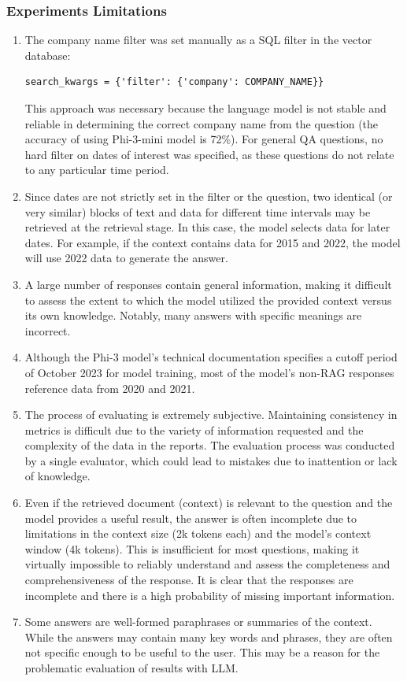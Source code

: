 \subsubsection{Experiments Limitations}
\begin{enumerate}
\item The company name filter was set manually as a SQL filter in the vector database:
\begin{verbatim}
search_kwargs = {'filter': {'company': COMPANY_NAME}}
\end{verbatim}
This approach was necessary because the language model is not stable and reliable in determining the correct company name from the question (the accuracy of using Phi-3-mini model is 72\%). For general QA questions, no hard filter on dates of interest was specified, as these questions do not relate to any particular time period.
\item Since dates are not strictly set in the filter or the question, two identical (or very similar) blocks of text and data for different time intervals may be retrieved at the retrieval stage. In this case, the model selects data for later dates. For example, if the context contains data for 2015 and 2022, the model will use 2022 data to generate the answer.
\item A large number of responses contain general information, making it difficult to assess the extent to which the model utilized the provided context versus its own knowledge. Notably, many answers with specific meanings are incorrect.
\item Although the Phi-3 model's technical documentation specifies a cutoff period of October 2023 for model training, most of the model's non-RAG responses reference data from 2020 and 2021.
\item The process of evaluating is extremely subjective. Maintaining consistency in metrics is difficult due to the variety of information requested and the complexity of the data in the reports. The evaluation process was conducted by a single evaluator, which could lead to mistakes due to inattention or lack of knowledge.
\item Even if the retrieved document (context) is relevant to the question and the model provides a useful result, the answer is often incomplete due to limitations in the context size (2k tokens each) and the model's context window (4k tokens). This is insufficient for most questions, making it virtually impossible to reliably understand and assess the completeness and comprehensiveness of the response. It is clear that the responses are incomplete and there is a high probability of missing important information.
\item Some answers are well-formed paraphrases or summaries of the context. While the answers may contain many key words and phrases, they are often not specific enough to be useful to the user. This may be a reason for the problematic evaluation of results with LLM.
\end{enumerate}


